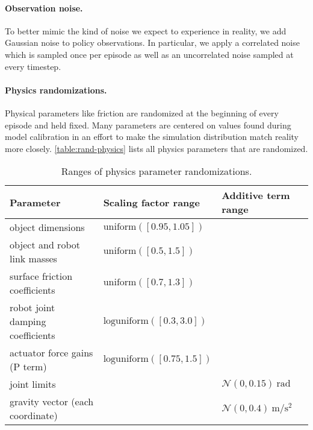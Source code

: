 \paragraph{Observation noise.}
To better mimic the kind of noise we expect to experience in reality, we add Gaussian noise to policy observations.
In particular, we apply a correlated noise which is sampled once per episode
as well as an uncorrelated noise sampled at every timestep.

\paragraph{Physics randomizations.} Physical parameters like friction are randomized at the beginning of every episode and held fixed. Many parameters are centered on values found during model calibration in an effort to make the simulation distribution match reality more closely. \autoref{table:rand-physics} lists all physics parameters that are randomized.

\begin{table}
    \footnotesize
    \centering
    \caption{Ranges of physics parameter randomizations.}
    \renewcommand{\arraystretch}{1.3}
    \begin{tabular}{@{}lll@{}}
        \toprule
        \textbf{Parameter} & \textbf{Scaling factor range} & \textbf{Additive term range} \\ \midrule
        object dimensions & $\mbox{uniform}([0.95,1.05])$ & \\
        object and robot link masses & $\mbox{uniform}([0.5,1.5])$ & \\
        surface friction coefficients & $\mbox{uniform}([0.7,1.3])$ & \\
        robot joint damping coefficients & $\mbox{loguniform}([0.3,3.0])$ & \\
        actuator force gains (P term) & $\mbox{loguniform}([0.75,1.5])$ & \\ \hline
        joint limits & & $\mathcal{N}(0,0.15)~\si{\radian}$  \\
        gravity vector (each coordinate) && $\mathcal{N}(0,0.4)~\si{\m\per\s^2}$ \\ %
        \bottomrule
    \end{tabular}
\label{table:rand-physics}
\end{table}


